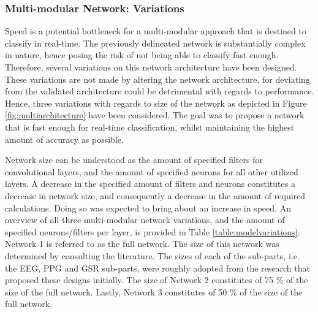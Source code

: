 \documentclass[12pt]{article}
\begin{document}
\subsubsection{Multi-modular Network: Variations}
Speed is a potential bottleneck for a multi-modular approach that is destined to classify in real-time. The previously delineated network is substantially complex in nature, hence posing the risk of not being able to classify fast enough. Therefore, several variations on this network architecture have been designed. These variations are not made by altering the network architecture, for deviating from the validated architecture could be detrimental with regards to performance. Hence, three variations with regards to size of the network as depicted in Figure \ref{fig:multiarchitecture} have been considered. The goal was to propose a network that is fast enough for real-time classification, whilst maintaining the highest amount of accuracy as possible. 

Network size can be understood as the amount of specified filters for convolutional layers, and the amount of specified neurons for all other utilized layers. A decrease in the specified amount of filters and neurons constitutes a decrease in network size, and consequently a decrease in the amount of required calculations. Doing so was expected to bring about an increase in speed. An overview of all three multi-modular network variations, and the amount of specified neurons/filters per layer, is provided in Table \ref{table:modelvariations}. Network 1 is referred to as the full network. The size of this network was determined by consulting the literature. The sizes of each of the sub-parts, i.e. the EEG, PPG and GSR sub-parts, were roughly adopted from the research that proposed these designs initially. The size of Network 2 constitutes of 75 \% of the size of the full network. Lastly, Network 3 constitutes of 50 \% of the size of the full network.
\end{document}
